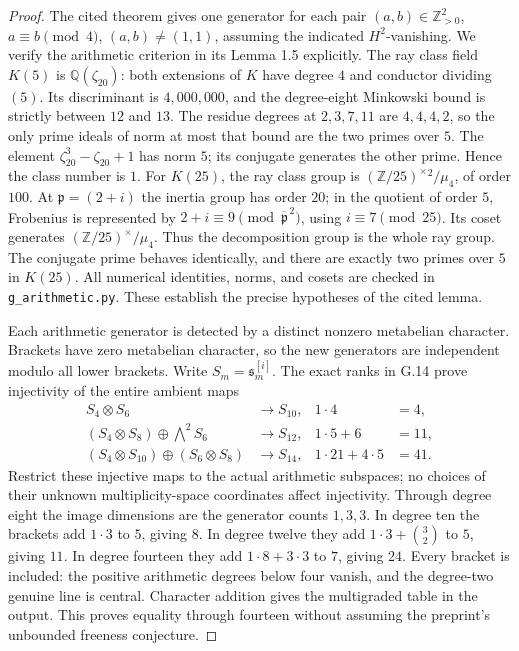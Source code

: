 \begin{proof}
The cited theorem gives one generator for each pair
$(a,b)\in\mathbb Z_{>0}^2$, $a\equiv b\pmod4$,
$(a,b)\ne(1,1)$, assuming the indicated $H^2$-vanishing.
We verify the arithmetic criterion in its Lemma 1.5 explicitly.
The ray class field $K(5)$ is $\mathbb Q(\zeta_{20})$:
both extensions of $K$ have degree $4$ and conductor dividing
$(5)$. Its discriminant is $4{,}000{,}000$, and the degree-eight
Minkowski bound is strictly between $12$ and $13$. The residue
degrees at $2,3,7,11$ are $4,4,4,2$, so the only prime ideals
of norm at most that bound are the two primes over $5$.
The element $\zeta_{20}^3-\zeta_{20}+1$ has norm $5$;
its conjugate generates the other prime. Hence the class number
is $1$. For $K(25)$, the ray class group is
$(\mathbb Z/25)^\times{}^2/\mu_4$, of order $100$.
At $\mathfrak p=(2+i)$ the inertia group has order $20$;
in the quotient of order $5$, Frobenius is represented by
$2+i\equiv9\pmod{\overline{\mathfrak p}^{\,2}}$, using
$i\equiv7\pmod{25}$. Its coset generates
$(\mathbb Z/25)^\times/\mu_4$. Thus the decomposition
group is the whole ray group. The conjugate prime behaves
identically, and there are exactly two primes over $5$ in
$K(25)$. All numerical identities, norms, and cosets are
checked in \texttt{g\_arithmetic.py}. These establish the
precise hypotheses of the cited lemma.

Each arithmetic generator is detected by a distinct nonzero
metabelian character. Brackets have zero metabelian character,
so the new generators are independent modulo all lower
brackets. Write $S_m=\mathfrak s_m^{[i]}$. The exact ranks
in G.14 prove injectivity of the entire ambient maps
\[
\begin{aligned}
 S_4\otimes S_6&\longrightarrow S_{10},& 1\cdot4&=4,\\
 (S_4\otimes S_8)\oplus\bigwedge^2S_6
   &\longrightarrow S_{12},& 1\cdot5+6&=11,\\
 (S_4\otimes S_{10})\oplus(S_6\otimes S_8)
   &\longrightarrow S_{14},& 1\cdot21+4\cdot5&=41.
\end{aligned}
\]
Restrict these injective maps to the actual arithmetic
subspaces; no choices of their unknown multiplicity-space
coordinates affect injectivity. Through degree eight the
image dimensions are the generator counts $1,3,3$. In
degree ten the brackets add $1\cdot3$ to $5$, giving $8$.
In degree twelve they add $1\cdot3+\binom32$ to $5$, giving
$11$. In degree fourteen they add $1\cdot8+3\cdot3$ to
$7$, giving $24$. Every bracket is included: the positive
arithmetic degrees below four vanish, and the degree-two
genuine line is central. Character addition gives the
multigraded table in the output. This proves equality
through fourteen without assuming the preprint's
unbounded freeness conjecture.
\end{proof}


